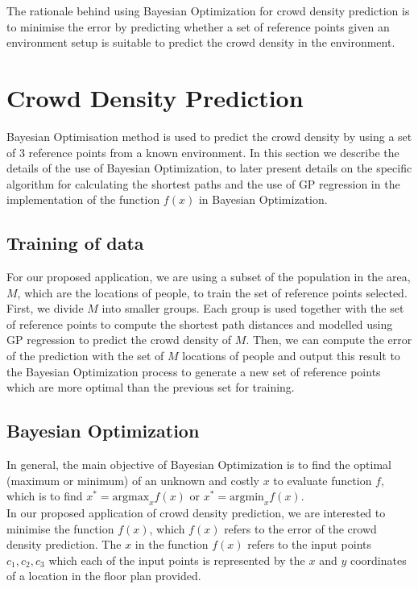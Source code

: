 \documentclass[letterpaper]{article}
\begin{document}
The rationale behind using Bayesian Optimization for crowd density prediction is to minimise the error by predicting whether a set of reference points given an environment setup is suitable to predict the crowd density in the environment.

\section{Crowd Density Prediction}

Bayesian Optimisation method is used to predict the crowd density by using a set of $3$ reference points from a known environment. In this section we describe the details of the use of Bayesian Optimization, to later present details on the specific algorithm for calculating the shortest paths and the use of GP regression in the implementation of the function $f(x)$ in Bayesian Optimization.

\subsection{Training of data}

For our proposed application, we are using a subset of the population in the area, $M$, which are the locations of people, to train the set of reference points selected. First, we divide $M$ into smaller groups. Each group is used together with the set of reference points to compute the shortest path distances and modelled using GP regression to predict the crowd density of $M$. Then, we can compute the error of the prediction with the set of $M$ locations of people and output this result to the Bayesian Optimization process to generate a new set of reference points which are more optimal than the previous set for training.

\subsection{Bayesian Optimization}

In general, the main objective of Bayesian Optimization is to find the optimal (maximum or minimum) of an unknown and costly $x$ to evaluate function $f$, which is to find $x^* = \text{argmax}_x f(x)$ or $x^* = \text{argmin}_x f(x)$. \\

In our proposed application of crowd density prediction, we are interested to minimise the function $f(x)$, which $f(x)$ refers to the error of the crowd density prediction. The $x$ in the function $f(x)$ refers to the input points $c_1, c_2, c_3$ which each of the input points is represented by the $x$ and $y$ coordinates of a location in the floor plan provided.  \\
\end{document}
